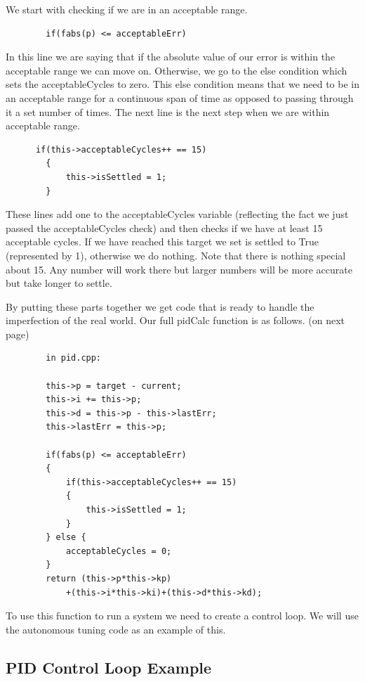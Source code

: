 \documentclass[12pt]{report}
\begin{document}
    We start with checking if we are in an acceptable range.

    \begin{verbatim}
        if(fabs(p) <= acceptableErr)
    \end{verbatim}

    In this line we are saying that if the absolute value of our error is within the acceptable range we can move on.
    Otherwise, we go to the else condition which sets the acceptableCycles to zero.
    This else condition means that we need to be in an acceptable range for a continuous span of time as opposed to passing through it a set number of times.
    The next line is the next step when we are within acceptable range.

    \begin{verbatim}
      if(this->acceptableCycles++ == 15)
        {
            this->isSettled = 1;
        }
    \end{verbatim}

    These lines add one to the acceptableCycles variable (reflecting the fact we just passed the acceptableCycles check) and then checks if we have at least 15 acceptable cycles.
    If we have reached this target we set is settled to True (represented by 1), otherwise we do nothing. 
    Note that there is nothing special about 15.
    Any number will work there but larger numbers will be more accurate but take longer to settle.

    By putting these parts together we get code that is ready to handle the imperfection of the real world. Our full pidCalc function is as follows. (on next page)

    \begin{verbatim}
        in pid.cpp:

        this->p = target - current;
        this->i += this->p;
        this->d = this->p - this->lastErr;
        this->lastErr = this->p;

        if(fabs(p) <= acceptableErr)
        {
            if(this->acceptableCycles++ == 15)
            {
                this->isSettled = 1;
            }
        } else {
            acceptableCycles = 0;
        }
        return (this->p*this->kp)
            +(this->i*this->ki)+(this->d*this->kd);
    \end{verbatim}

    To use this function to run a system we need to create a control loop. We will use the autonomous tuning code as an example of this.

\subsection{PID Control Loop Example}
\end{document}
